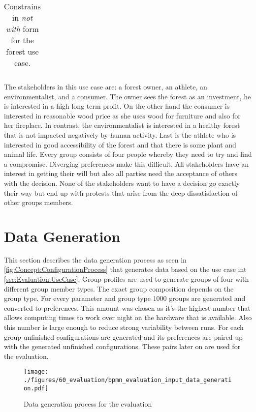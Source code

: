 \begin{table}
\begin{center}
\begin{tabularx}{\columnwidth}{cl|X|X|X|X|X|X|X|X|X|X|X|X|X|X|X|X|X|X|X|X|X|}
        \end{tabularx}
        \caption{Constrains in \emph{not with} form for the forest use case.}
        \label{tab:Evaluation:UseCase}
    \end{center}
\end{table}

The stakeholders in this use case are: a forest owner, an athlete, an environmentalist, and a consumer. The owner sees the forest as an investment, he is interested in a high long term profit. On the other hand the consumer is interested in reasonable wood price as she uses wood for furniture and also for her fireplace. In contrast, the environmentalist is interested in a healthy forest that is not impacted negatively by human activity. Last is the athlete who is interested in good accessibility of the forest and that there is some plant and animal life.
Every group consists of four people whereby they need to try and find a compromise. Diverging preferences make this difficult. All stakeholders have an interest in getting their will but also all parties need the acceptance of others with the decision. None of the stakeholders want to have a decision go exactly their way but end up with protests that arise from the deep dissatisfaction of other groups members.

\section{Data Generation}
\label{sec:Evaluation:GeneratingGroups}

This section describes the data generation process as seen in \autoref{fig:Concept:ConfigurationProcess} that generates data based on the use case int  \autoref{sec:Evaluation:UseCase}. Group profiles are used to generate groups of four with different group member types. The exact group composition depends on the group type. For every parameter and group type $1000$ groups are generated and converted to preferences. This amount was chosen as it's the highest number that allows computing times to work over night on the hardware that is available. Also this number is large enough to reduce strong variability between runs. For each group unfinished configurations are generated and its preferences are paired up with the generated unfinished configurations. These pairs later on are used for the evaluation. 

\begin{figure}
    \centering
    \texttt{[image: ./figures/60\_evaluation/bpmn\_evaluation\_input\_data\_generation.pdf]}
    \caption{Data generation process for the evaluation}
    \label{fig:Evaluation:GeneratingDataProcess}
\end{figure}

